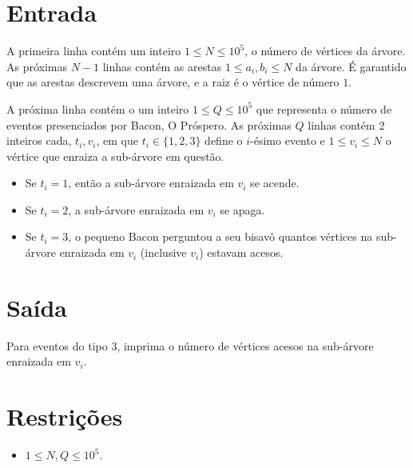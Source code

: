 %
%

\section*{Entrada}

A primeira linha contém um inteiro $1 \leq N \leq 10^5$, o número de vértices da árvore.
As próximas $N-1$ linhas contém as arestas $1 \leq a_i, b_i \leq N$ da árvore. É garantido que as arestas descrevem uma árvore, e a raiz é
o vértice de número $1$.

A próxima linha contém o um inteiro $1 \leq Q \leq 10^5$ que representa o número de eventos presenciados por Bacon, O Próspero.
As próximas $Q$ linhas contém 2 inteiros cada, $t_i, v_i$, em que $t_i \in \{1, 2, 3\}$ define o $i$-ésimo evento e $1 \leq v_i \leq N$ o vértice que enraiza a sub-árvore em questão.
\begin{itemize}
\item Se $t_i = 1$, então a sub-árvore enraizada em $v_i$ se acende.
\item Se $t_i = 2$, a sub-árvore enraizada em $v_i$ se apaga.
\item Se $t_i = 3$, o pequeno Bacon perguntou a seu bisavô quantos vértices na sub-árvore enraizada em $v_i$ (inclusive $v_i$) estavam acesos.
\end{itemize}

%
%

\section*{Saída}

Para eventos do tipo $3$, imprima o número de vértices acesos na sub-árvore enraizada em $v_i$.


\section*{Restrições}

\begin{itemize}
\item $1 \leq N, Q \leq 10^5$.
\end{itemize}

\exemplo

